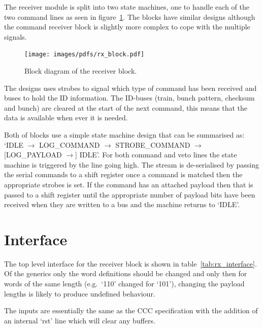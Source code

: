     The receiver module is split into two state machines, one to handle each of the two command lines as seen in figure~\ref{fig:rx_block}. The blocks have similar designs although the command receiver block is slightly more complex to cope with the multiple signals. 
    \begin{figure}[htbp] 
        \centering
        \texttt{[image: images/pdfs/rx\_block.pdf]}
        \caption{Block diagram of the receiver block.}
        \label{fig:rx_block}
    \end{figure}
  
    The designs uses strobes to signal which type of command has been received and buses to hold the ID information. The ID-buses (train, bunch pattern, checksum and bunch) are cleared at the start of the next command, this means that the data is available when ever it is needed.
  
    Both of blocks use a simple state machine design that can be summarised as: `IDLE \( \rightarrow \) LOG\_COMMAND \( \rightarrow \) STROBE\_COMMAND \( \rightarrow \) [LOG\_PAYLOAD \( \rightarrow \)] IDLE'. For both command and veto lines the state machine is triggered by the line going high. The stream is de-serialised by passing the serial commands to a shift register once a command is matched then the appropriate strobes is set. If the command has an attached payload then that is passed to a shift register until the appropriate number of payload bits have been received when they are written to a bus and the machine returns to `IDLE'.
    \section{Interface} %
    \label{sub:rx_interface}
    The top level interface for the receiver block is shown in table~\ref{tab:rx_interface}. Of the generics only the word definitions should be changed and only then for words of the same length (e.g.\ `110' changed for `101'), changing the payload lengths is likely to produce undefined behaviour.
    
    The inputs are essentially the same as the CCC specification with the addition of an internal `rst' line which will clear any buffers.
    
